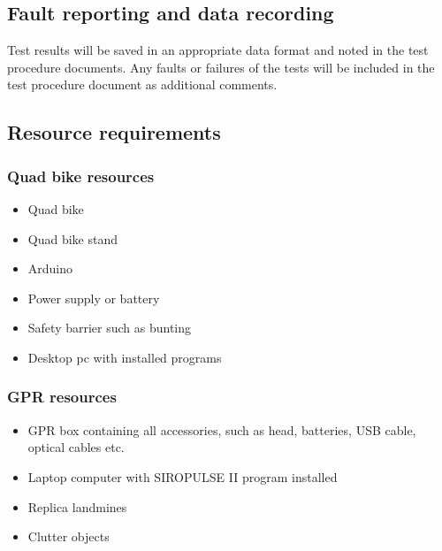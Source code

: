 \documentclass[main.tex]{subfiles}
\begin{document}
\begin{appendices}
\subsection{Fault reporting and data recording}
Test results will be saved in an appropriate data format and noted in the test procedure documents. Any faults or failures of the tests will be included in the test procedure document as additional comments. 

\subsection{Resource requirements}

\subsubsection{Quad bike resources}
\begin{itemize}
\item Quad bike
\item Quad bike stand
\item Arduino
\item Power supply or battery
\item Safety barrier such as bunting
\item Desktop pc with installed programs
\end{itemize} 

\subsubsection{GPR resources}
\begin{itemize}
\item GPR box containing all accessories, such as head, batteries, USB cable, optical cables etc. 
\item Laptop computer with SIROPULSE II program installed
\item Replica landmines
\item Clutter objects


\end{itemize}
\end{appendices}
\end{document}
